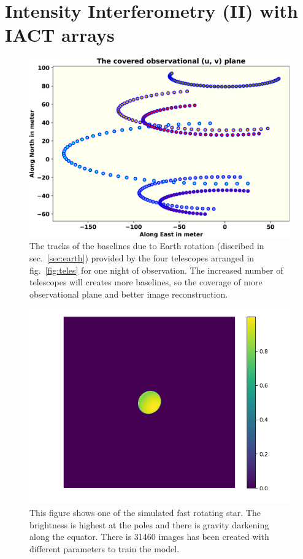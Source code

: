 \section{Intensity Interferometry (II) with IACT arrays}
\begin{figure}
  \includegraphics[width=\linewidth]{fig/baseline.png}
  \caption{The tracks of the baselines due to Earth rotation (discribed in sec.~\ref{sec:earth}) provided by the four telescopes arranged in fig.~\ref{fig:teles} for one night of observation. The increased number of telescopes will creates more baselines, so the coverage of more observational plane and better image reconstruction.}
  \label{fig:base}
\end{figure}
\begin{figure}[hbt]
  \includegraphics[width=\linewidth]{fig/ellipse/ellipse1612.png}
  \caption{This figure shows one of the simulated fast rotating star. The brightness is highest at the poles and there is gravity darkening along the equator. There is 31460 images has been created with different parameters to train the model.}
  \label{fig:image}
\end{figure}

